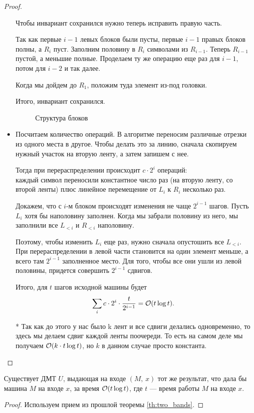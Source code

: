 \begin{proof}
\begin{itemize}
			Чтобы инвариант сохранился нужно теперь исправить правую часть.

			Так как первые $ i-1$ левых блоков были пусты, первые $ i-1$ правых блоков полны, а $ R_i$ пуст.
			Заполним половину в $ R_i$ символами из $ R_{i-1}$.
			Теперь $ R_{i-1}$ пустой, а меньшие полные. Проделаем ту же операцию еще раз для $ i-1$, потом для $ i-2$ и так далее.

			Когда мы дойдем до $ R_1$, положим туда элемент из-под головки.

			Итого, инвариант  сохранился.
			\begin{figure}[ht]
				\centering
				\caption{Структура блоков}
				\label{fig:blocks}
			\end{figure}
		\item Посчитаем количество операций. В алгоритме переносим различные отрезки из одного места в другое. Чтобы делать это за линию, сначала скопируем нужный участок на вторую ленту, а затем запишем с нее.

			Тогда при перераспределении происходит $ c\cdot 2^{i}$ операций: \\ 
			каждый символ переносили константное число раз (на вторую ленту, со второй ленты)  плюс линейное перемещение от $ L_i$ к $ R_i$ несколько раз.

			Докажем, что с $ i$-м блоком происходят изменения не чаще $ 2^{i-1}$  шагов. Пусть $ L_i$ хотя бы наполовину заполнен. Когда мы забрали половину из него, мы заполнили все $ L_{<i}$ и $ R_{<i}$ наполовину.

			Поэтому, чтобы изменить $ L_i$ еще раз, нужно сначала опустошить все $ L_{<i}$.
			При перераспределении в левой части становится на один элемент меньше, а всего там $ 2^{i-1}$ заполненное место. Для того, чтобы все они ушли из левой половины, придется совершить $ 2^{i-1}$ сдвигов.

			Итого, для $ t$ шагов исходной машины будет
			\[
				\sum_{i}^{}c\cdot 2^{i} \cdot \frac{t}{2^{i-1}} = \mathcal{O}(t \log t)
			.\]
			
			* Так как до этого у нас было k лент и все сдвиги делались одновременно, то здесь мы делаем сдвиг каждой ленты поочереди. То есть на самом деле мы получаем $ \mathcal{O}(k \cdot t \log t)$, но $ k$ в данном случае просто константа.
	\end{itemize}
\end{proof}

\begin{thm}[Об универсальной МТ]
	Существует ДМТ $ U$, выдающая на входе $(M, ~ x)$ тот же результат, что дала бы машина $ M$ на входе $ x$, за время $ \mathcal{O}(t \log t)$, где $ t $ --- время работы $ M$ на входе $ x$.
\end{thm}
\begin{proof}
	Используем прием из прошлой теоремы \ref{th:two_bands}.
\end{proof}

